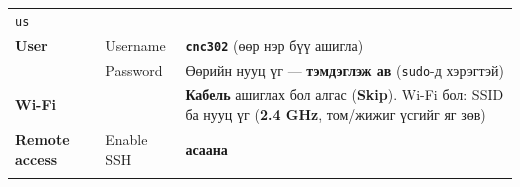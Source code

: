 \begin{enumerate}
\begin{longtable}[]{@{}lll@{}}
\begin{minipage}[t]{0.30\columnwidth}
  \texttt{us}\strut
  \end{minipage}\tabularnewline
  \begin{minipage}[t]{0.30\columnwidth}\raggedright
  \textbf{User}\strut
  \end{minipage} & \begin{minipage}[t]{0.30\columnwidth}\raggedright
  Username\strut
  \end{minipage} & \begin{minipage}[t]{0.30\columnwidth}\raggedright
  \textbf{\texttt{cnc302}} (өөр нэр бүү ашигла)\strut
  \end{minipage}\tabularnewline
  \begin{minipage}[t]{0.30\columnwidth}\raggedright
  \strut
  \end{minipage} & \begin{minipage}[t]{0.30\columnwidth}\raggedright
  Password\strut
  \end{minipage} & \begin{minipage}[t]{0.30\columnwidth}\raggedright
  Өөрийн нууц үг --- \textbf{тэмдэглэж ав} (\texttt{sudo}-д хэрэгтэй)\strut
  \end{minipage}\tabularnewline
  \begin{minipage}[t]{0.30\columnwidth}\raggedright
  \textbf{Wi-Fi}\strut
  \end{minipage} & \begin{minipage}[t]{0.30\columnwidth}\raggedright
  \strut
  \end{minipage} & \begin{minipage}[t]{0.30\columnwidth}\raggedright
  \textbf{Кабель} ашиглах бол алгас (\textbf{Skip}). Wi-Fi бол: SSID ба нууц үг (\textbf{2.4 GHz}, том/жижиг үсгийг яг зөв)\strut
  \end{minipage}\tabularnewline
  \begin{minipage}[t]{0.30\columnwidth}\raggedright
  \textbf{Remote access}\strut
  \end{minipage} & \begin{minipage}[t]{0.30\columnwidth}\raggedright
  Enable SSH\strut
  \end{minipage} & \begin{minipage}[t]{0.30\columnwidth}\raggedright
  \textbf{асаана}\strut
  \end{minipage}\tabularnewline
  \begin{minipage}[t]{0.30\columnwidth}\raggedright
  \strut
  \end{minipage} & \begin{minipage}[t]{0.30\columnwidth}\raggedright

\end{minipage}
\end{longtable}
\end{enumerate}
